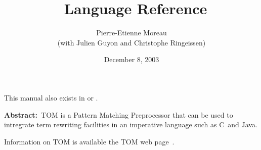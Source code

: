 \documentclass[a4paper]{book}
\title{\TOM\ Language Reference}
\author{Pierre-Etienne Moreau\\(with Julien Guyon and Christophe Ringeissen)}
\date{December 8, 2003}
\newcommand{\Clang}{\textsf{C}}
\newcommand{\Java}{\textsf{Java}}
\begin{document}
\maketitle

\begin{table}[h]
This manual also exists in   or .
\end{table}

\textbf{Abstract:}~TOM is a Pattern Matching Preprocessor that can be used to
intregrate term rewriting facilities in an imperative language such as
\Clang\ and \Java.

Information on TOM is available the TOM web page~.

\tableofcontents

%










\end{document}
